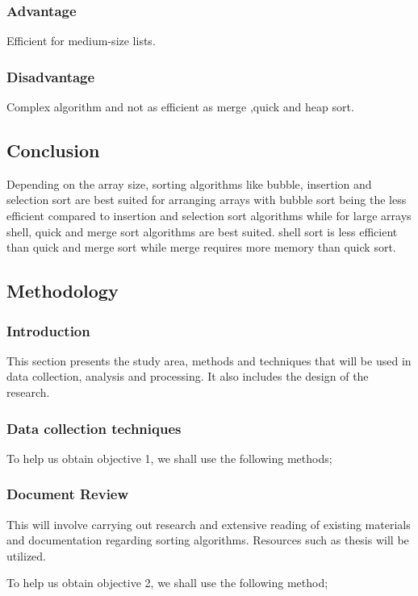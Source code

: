 \documentclass{article}
\begin{document}
\subsubsection{Advantage}
Efficient for medium-size lists.

\subsubsection{Disadvantage}
Complex algorithm and not as efficient as merge ,quick and heap sort.

\subsection{Conclusion}
Depending on the array size, sorting algorithms like bubble, insertion and selection sort are best suited for arranging arrays with bubble sort being the less efficient compared to insertion and selection sort algorithms while for large arrays shell, quick and merge sort algorithms are best suited. shell sort is less efficient than quick and merge sort while merge requires more memory than quick sort.

\subsection{Methodology}

\subsubsection{Introduction}
This section presents the study area, methods and techniques that will be used in data collection, analysis and processing. It also includes the design of the research. 	

\subsubsection{Data collection techniques}
To help us obtain objective 1, we shall use the following methods;

\subsubsection{Document Review}
This will involve carrying out research and extensive reading of existing materials and documentation regarding sorting algorithms. Resources such as thesis will be utilized.

To help us obtain objective 2, we shall use the following method;
\end{document}
